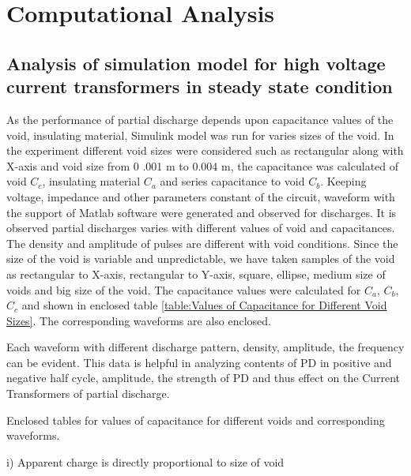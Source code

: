 \section{Computational Analysis}
\subsection[Analysis of simulation model for high voltage current transformers in steady state condition]{Analysis of simulation model for high voltage\\current transformers in steady state condition}

As the performance of partial discharge depends upon capacitance values of the void, insulating material, Simulink model was run for varies sizes of the void. In the experiment different void sizes were considered such as rectangular along with X-axis and void size from 0 .001 m to 0.004 m, the capacitance was calculated of void $C_c$, insulating material $C_a$ and series capacitance to void $C_b$. Keeping voltage, impedance and other parameters constant of the circuit, waveform with the support of Matlab software were generated and observed for discharges. It is observed partial discharges varies with different values of void and capacitances. The density and amplitude of pulses are different with void conditions. Since the size of the void is variable and unpredictable, we have taken samples of the void as rectangular to X-axis, rectangular to Y-axis, square, ellipse, medium size of voids and big size of the void. The capacitance values were calculated for $C_a$, $C_b$, $C_c$ and shown in enclosed table \ref{table:Values of Capacitance for Different Void Sizes}. The corresponding waveforms are also enclosed\setlength{\parskip}{1em}.

Each waveform with different discharge pattern, density, amplitude, the frequency can be evident. This data is helpful in analyzing contents of PD in positive and negative half cycle, amplitude, the strength of PD and thus effect on the Current Transformers of partial discharge.

Enclosed tables for values of capacitance for different voids and corresponding waveforms.

i)	Apparent charge is directly proportional to size of void

